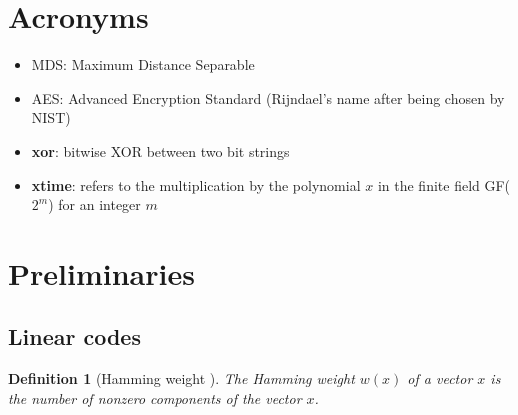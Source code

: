 \documentclass{report}
\newtheorem{definition}{Definition}{\bfseries}{\itshape}
\begin{document}
\section{Acronyms}
\begin{itemize}
    \item MDS: Maximum Distance Separable
    \item AES: Advanced Encryption Standard (Rijndael's name after being chosen by NIST)
    \item \textbf{xor}: bitwise XOR between two bit strings
    \item \textbf{xtime}: refers to the multiplication by the polynomial $x$ in the finite field GF($2^m$) for an integer $m$
\end{itemize}

\section{Preliminaries}
\subsection{Linear codes}
\begin{definition}[Hamming weight \cite{SloaneBook}]
The Hamming weight $w(x)$ of a vector $x$ is the number of nonzero components of the vector $x$.
\end{definition}
\end{document}
